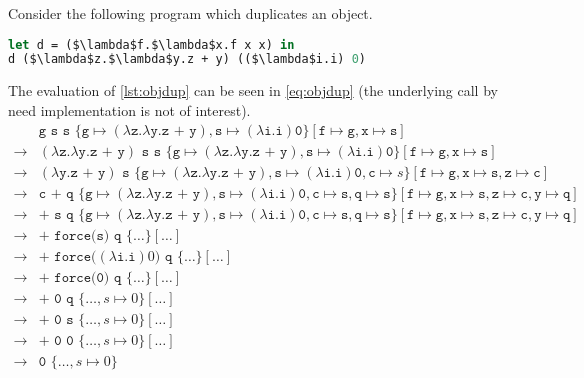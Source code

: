 \documentclass[11pt,oneside,a4paper]{report}
\begin{document}
\begin{exmp}
Consider the following program which duplicates an object.
\begin{lstlisting}[language=ML,caption={Object duplication},label={lst:objdup},mathescape=true]
let d = ($\lambda$f.$\lambda$x.f x x) in
d ($\lambda$z.$\lambda$y.z + y) (($\lambda$i.i) 0)
\end{lstlisting}
The evaluation of \autoref{lst:objdup} can be seen in \autoref{eq:objdup} (the underlying call by need implementation is not of interest).
\begin{align}
    \label{eq:objdup}
    &\texttt{g s s }\{ \texttt{g} \mapsto (\lambda \texttt{z}.\lambda \texttt{y}.\texttt{z + y}), \texttt{s} \mapsto (\lambda\texttt{i}.\texttt{i}) \texttt{0} \}[\texttt{f} \mapsto \texttt{g}, \texttt{x} \mapsto \texttt{s}]\\
    \rightarrow &(\lambda \texttt{z}.\lambda \texttt{y}.\texttt{z + y})\texttt{ s s }\{ \texttt{g} \mapsto (\lambda \texttt{z}.\lambda \texttt{y}.\texttt{z + y}), \texttt{s} \mapsto (\lambda\texttt{i}.\texttt{i}) \texttt{0} \}[\texttt{f} \mapsto \texttt{g}, \texttt{x} \mapsto \texttt{s}]\tag*{}\\
    \rightarrow &(\lambda \texttt{y}.\texttt{z + y})\texttt{ s }\{ \texttt{g} \mapsto (\lambda \texttt{z}.\lambda \texttt{y}.\texttt{z + y}), \texttt{s} \mapsto (\lambda\texttt{i}.\texttt{i}) \texttt{0}, \texttt{c} \mapsto s \}[\texttt{f} \mapsto \texttt{g}, \texttt{x} \mapsto \texttt{s}, \texttt{z} \mapsto \texttt{c}]\tag*{}\\
    \rightarrow &\texttt{c + q }\{ \texttt{g} \mapsto (\lambda \texttt{z}.\lambda \texttt{y}.\texttt{z + y}), \texttt{s} \mapsto (\lambda\texttt{i}.\texttt{i}) \texttt{0}, \texttt{c} \mapsto \texttt{s}, \texttt{q} \mapsto \texttt{s}\}[\texttt{f} \mapsto \texttt{g}, \texttt{x} \mapsto \texttt{s}, \texttt{z} \mapsto \texttt{c}, \texttt{y} \mapsto \texttt{q}]\tag*{}\\
    \rightarrow &\texttt{+ s q }\{ \texttt{g} \mapsto (\lambda \texttt{z}.\lambda \texttt{y}.\texttt{z + y}), \texttt{s} \mapsto (\lambda\texttt{i}.\texttt{i}) \texttt{0}, \texttt{c} \mapsto \texttt{s}, \texttt{q} \mapsto \texttt{s}\}[\texttt{f} \mapsto \texttt{g}, \texttt{x} \mapsto \texttt{s}, \texttt{z} \mapsto \texttt{c}, \texttt{y} \mapsto \texttt{q}]\tag*{}\\
    \rightarrow &\texttt{+ force(s) q }\{ \dots \}[\dots]\tag*{}\\
    \rightarrow &\texttt{+ force(}(\lambda\texttt{i}.\texttt{i})0\texttt{) q } \{ \dots \}[\dots]\tag*{}\\
    \rightarrow &\texttt{+ force(0) q }\{ \dots \}[\dots]\tag*{}\\
    \rightarrow &\texttt{+ 0 q }\{ \dots, s \mapsto 0 \}[\dots]\tag*{}\\
    \rightarrow &\texttt{+ 0 s }\{ \dots, s \mapsto 0 \}[\dots]\tag*{}\\
    \rightarrow &\texttt{+ 0 0 }\{ \dots, s \mapsto 0 \}[\dots]\tag*{}\\
    \rightarrow &\texttt{0 }\{ \dots, s \mapsto 0 \}\tag*{}
\end{align}
\end{exmp}
\end{document}
